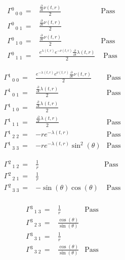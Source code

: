 \documentclass[]{article}
\begin{document}
\begin{align*}
	  {\Gamma}{}^{0}\,{}_{0}\,{}_{0}\, =& \frac{\frac{\partial}{\partial t} \nu{\left(t,r \right)}}{2}  & \text{Pass} \\
	 {\Gamma}{}^{0}\,{}_{0}\,{}_{1}\, =& \frac{\frac{\partial}{\partial r} \nu{\left(t,r \right)}}{2}\\
	 {\Gamma}{}^{0}\,{}_{1}\,{}_{0}\, =& \frac{\frac{\partial}{\partial r} \nu{\left(t,r \right)}}{2} & \text{Pass}\\	
	 {\Gamma}{}^{0}\,{}_{1}\,{}_{1}\, =& \frac{e^{\lambda_{}{\left(t,r \right)}} e^{- \nu{\left(t,r \right)}} \frac{\partial}{\partial t} \lambda_{}{\left(t,r \right)}}{2} & \text{ Pass}
\end{align*}
	
\begin{align*}
	 {\Gamma}{}^{1}\,{}_{0}\,{}_{0}\, =& \frac{e^{- \lambda_{}{\left(t,r \right)}} e^{\nu{\left(t,r \right)}} \frac{\partial}{\partial r} \nu{\left(t,r \right)}}{2}  & \text{Pass}\\
	 {\Gamma}{}^{1}\,{}_{0}\,{}_{1}\, =& \frac{\frac{\partial}{\partial t} \lambda_{}{\left(t,r \right)}}{2}  & \text{Pass}\\
	 {\Gamma}{}^{1}\,{}_{1}\,{}_{0}\, =& \frac{\frac{\partial}{\partial t} \lambda_{}{\left(t,r \right)}}{2}\\
	 {\Gamma}{}^{1}\,{}_{1}\,{}_{1}\, =& \frac{\frac{\partial}{\partial r} \lambda_{}{\left(t,r \right)}}{2} & \text{Pass} \\
	 {\Gamma}{}^{1}\,{}_{2}\,{}_{2}\, =& - r e^{- \lambda_{}{\left(t,r \right)}}  & \text{Pass}\\
	 {\Gamma}{}^{1}\,{}_{3}\,{}_{3}\, =& - r e^{- \lambda_{}{\left(t,r \right)}} \sin^{2}{\left(\theta \right)} & \text{Pass}
\end{align*}

\begin{align*}
	 {\Gamma}{}^{2}\,{}_{1}\,{}_{2}\, =& \frac{1}{r}  & \text{Pass}	\\
	 {\Gamma}{}^{2}\,{}_{2}\,{}_{1}\, =& \frac{1}{r}	\\
	 {\Gamma}{}^{2}\,{}_{3}\,{}_{3}\, =& - \sin{\left(\theta \right)} \cos{\left(\theta \right)} &	 \text{ Pass}\\
\end{align*}

\begin{align*}
	 {\Gamma}{}^{3}\,{}_{1}\,{}_{3}\, =& \frac{1}{r} & \text{Pass}\\
	 {\Gamma}{}^{3}\,{}_{2}\,{}_{3}\, =& \frac{\cos{\left(\theta \right)}}{\sin{\left(\theta \right)}}\\
	 {\Gamma}{}^{3}\,{}_{3}\,{}_{1}\, =& \frac{1}{r}\\
	 {\Gamma}{}^{3}\,{}_{3}\,{}_{2}\, =& \frac{\cos{\left(\theta \right)}}{\sin{\left(\theta \right)}}  & \text{Pass}
\end{align*}
\end{document}
